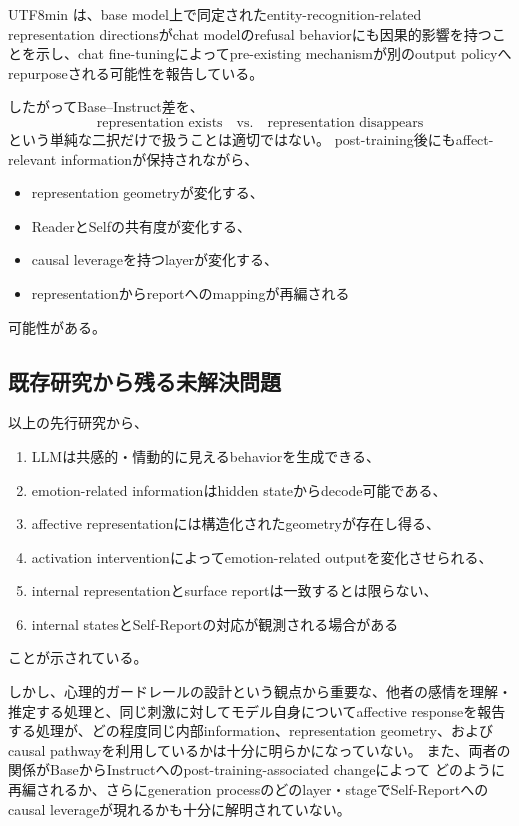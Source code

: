 \documentclass{article} %
\begin{document}
\begin{CJK*}{UTF8}{min}
\citet{ferrando2025know}は、base model上で同定されたentity-recognition-related representation directionsがchat modelのrefusal behaviorにも因果的影響を持つことを示し、chat fine-tuningによってpre-existing mechanismが別のoutput policyへrepurposeされる可能性を報告している\citep{ferrando2025know}。

したがってBase--Instruct差を、
\[
\text{representation exists}
\quad\text{vs.}\quad
\text{representation disappears}
\]
という単純な二択だけで扱うことは適切ではない。
post-training後にもaffect-relevant informationが保持されながら、
\begin{itemize}
    \item representation geometryが変化する、
    \item ReaderとSelfの共有度が変化する、
    \item causal leverageを持つlayerが変化する、
    \item representationからreportへのmappingが再編される
\end{itemize}
可能性がある。


\subsection{既存研究から残る未解決問題}

以上の先行研究から、
\begin{enumerate}
    \item LLMは共感的・情動的に見えるbehaviorを生成できる、
    \item emotion-related informationはhidden stateからdecode可能である、
    \item affective representationには構造化されたgeometryが存在し得る、
    \item activation interventionによってemotion-related outputを変化させられる、
    \item internal representationとsurface reportは一致するとは限らない、
    \item internal statesとSelf-Reportの対応が観測される場合がある
\end{enumerate}
ことが示されている。

しかし、心理的ガードレールの設計という観点から重要な、他者の感情を理解・推定する処理と、同じ刺激に対してモデル自身についてaffective responseを報告する処理が、どの程度同じ内部information、representation geometry、およびcausal pathwayを利用しているかは十分に明らかになっていない。
また、両者の関係がBaseからInstructへのpost-training-associated changeによって
どのように再編されるか、さらにgeneration processのどのlayer・stageでSelf-Reportへのcausal leverageが現れるかも十分に解明されていない。


\end{CJK*}
\end{document}
